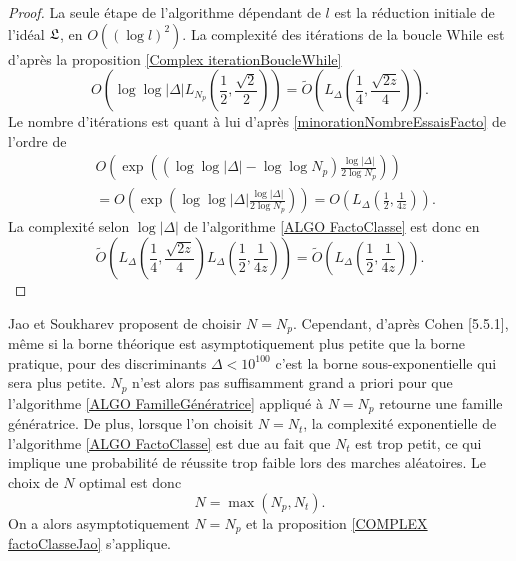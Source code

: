 \begin{proof}
	La seule étape de l'algorithme dépendant de $l$ est la réduction initiale de l'idéal $\mathfrak{L}$, en $O((\log l)^2)$. La complexité des itérations de la boucle While est d'après la proposition \ref{Complex iterationBoucleWhile} 
	\begin{equation*}
		O\left( \log\log|\Delta|L_{N_p}\left( \frac{1}{2},\frac{\sqrt{2}}{2}\right) \right) = \tilde{O}\left(  L_\Delta\left( \frac{1}{4}, \frac{\sqrt{2z}}{4} \right) \right).
	\end{equation*}
	Le nombre d'itérations est quant à lui d'après \ref{minorationNombreEssaisFacto} de l'ordre de 
	\begin{align*}
		&O\left( \exp \left( \left( \log\log|\Delta| - \log\log N_{p}  \right)\frac{\log|\Delta|}{2\log N_{p}} \right) \right) \\&= O\left( \exp \left( \log\log|\Delta|\frac{\log|\Delta|}{2\log N_{p}} \right) \right) = O\left( L_\Delta\left( \frac{1}{2},\frac{1}{4z}\right) \right).
	\end{align*}
	La complexité selon $\log|\Delta|$ de l'algorithme \ref{ALGO FactoClasse} est donc en 
	\begin{equation*}
		\tilde{O}\left(  L_\Delta\left( \frac{1}{4},\frac{\sqrt{2z}}{4}\right)L_\Delta\left( \frac{1}{2},\frac{1}{4z}\right)\right)  = \tilde{O}\left( L_\Delta\left(\frac{1}{2}, \frac{1}{4z} \right) \right).
	\end{equation*}
	
\end{proof}

\begin{Rem}\label{choixOptimalN}
	Jao et Soukharev \cite{JaoSoukharev} proposent de choisir $N = N_p$. Cependant, d'après Cohen \cite{Coh00}[5.5.1], même si la borne théorique est asymptotiquement plus petite que la borne pratique, pour des discriminants $\Delta < 10^{100}$ c'est la borne sous-exponentielle qui sera plus petite. $N_p$ n'est alors pas suffisamment grand a priori pour que l'algorithme \ref{ALGO FamilleGénératrice} appliqué à $N = N_p$ retourne une famille génératrice. De plus, lorsque l'on choisit $N = N_t$, la complexité exponentielle de l'algorithme \ref{ALGO FactoClasse} est due au fait que $N_t$ est trop petit, ce qui implique une probabilité de réussite trop faible lors des marches aléatoires. Le choix de $N$ optimal est donc
	\begin{equation*}
		N = \max(N_p,N_t).
	\end{equation*}
	On a alors asymptotiquement $N = N_p$ et la proposition \ref{COMPLEX factoClasseJao} s'applique. 
\end{Rem}


